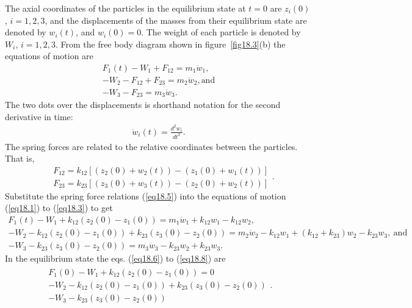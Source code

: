 \documentclass{AeroStructure-ERJohnson}
\begin{document}
The axial coordinates of the particles in the equilibrium state at $t = 0$ are $z_{i}(0)$, $i=1,2,3$, and the displacements of the masses from their equilibrium state are denoted by $w_{i}(t)$, and $w_{i}(0)=0$. The weight of each particle is denoted by $W_{i}$, $i=1,2,3$. From the free body diagram shown in figure~\ref{fig18.3}(b) the equations of motion are
\begin{gather}
\label{eq18.1}
F_{1}(t)-W_{1}+F_{12}=m_{1} \ddot{w}_{1},\\
\label{eq18.2}
-W_{2}-F_{12}+F_{23}=m_{2} \ddot{w}_{2}, \text{and}\\
\label{eq18.3}
-W_{3}-F_{23}=m_{3} \ddot{w}_{3}.
\end{gather}
The two dots over the displacements is shorthand notation for the second derivative in time:
\begin{align}\label{eq18.4}
\ddot{w}_{i}(t)=\frac{d^{2} w_{i}}{d t^{2}}.
\end{align}
The spring forces are related to the relative coordinates between the particles. That is,
\begin{equation}\label{eq18.5}
\begin{split}
&F_{12}=k_{12}\left[\left(z_{2}(0)+w_{2}(t)\right)-\left(z_{1}(0)+w_{1}(t)\right)\right] \\
&F_{23}=k_{23}\left[\left(z_{3}(0)+w_{3}(t)\right)-\left(z_{2}(0)+w_{2}(t)\right)\right]
\end{split}.
\end{equation}
Substitute the spring force relations (\ref{eq18.5}) into the equations of motion (\ref{eq18.1}) to (\ref{eq18.3}) to get
\begin{gather}\label{eq18.6}
F_{1}(t)-W_{1}+k_{12}\left(z_{2}(0)-z_{1}(0)\right)=m_{1} \ddot{w}_{1}+k_{12} w_{1}-k_{12} w_{2},
\\\label{eq18.7}
-W_{2}-k_{12}\left(z_{2}(0)-z_{1}(0)\right)+k_{23}\left(z_{3}(0)-z_{2}(0)\right)=m_{2} \ddot{w}_{2}-k_{12} w_{1}+\left(k_{12}+k_{23}\right) w_{2}-k_{23} w_{3},\ \text{and}
\\\label{eq18.8}
-W_{3}-k_{23}\left(z_{3}(0)-z_{2}(0)\right)=m_{3} \ddot{w}_{3}-k_{23} w_{2}+k_{23} w_{3}.
\end{gather}
In the equilibrium state the eqs. (\ref{eq18.6}) to (\ref{eq18.8}) are
\begin{align}\label{eq18.9}
\begin{gathered}F_{1}(0)-W_{1}+k_{12}\left(z_{2}(0)-z_{1}(0)\right)=0 \\-W_{2}-k_{12}\left(z_{2}(0)-z_{1}(0)\right)+k_{23}\left(z_{3}(0)-z_{2}(0)\right) \\-W_{3}-k_{23}\left(z_{3}(0)-z_{2}(0)\right)\end{gathered}.
\end{align}
\end{document}
